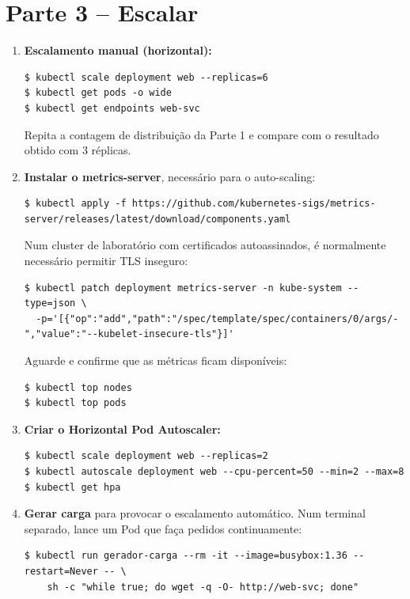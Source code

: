 \documentclass[11pt,a4paper]{article}
\begin{document}
\section{Parte 3 -- Escalar}
\begin{enumerate}[label=\arabic*.,resume]

  \item \textbf{Escalamento manual (horizontal):}
\begin{lstlisting}
$ kubectl scale deployment web --replicas=6
$ kubectl get pods -o wide
$ kubectl get endpoints web-svc
\end{lstlisting}
  Repita a contagem de distribuição da Parte 1 e compare com o resultado obtido com 3 réplicas.

  \item \textbf{Instalar o metrics-server}, necessário para o auto-scaling:
\begin{lstlisting}
$ kubectl apply -f https://github.com/kubernetes-sigs/metrics-server/releases/latest/download/components.yaml
\end{lstlisting}
  Num cluster de laboratório com certificados autoassinados, é normalmente necessário permitir TLS inseguro:
\begin{lstlisting}
$ kubectl patch deployment metrics-server -n kube-system --type=json \
  -p='[{"op":"add","path":"/spec/template/spec/containers/0/args/-","value":"--kubelet-insecure-tls"}]'
\end{lstlisting}
  Aguarde e confirme que as métricas ficam disponíveis:
\begin{lstlisting}
$ kubectl top nodes
$ kubectl top pods
\end{lstlisting}

  \item \textbf{Criar o Horizontal Pod Autoscaler:}
\begin{lstlisting}
$ kubectl scale deployment web --replicas=2
$ kubectl autoscale deployment web --cpu-percent=50 --min=2 --max=8
$ kubectl get hpa
\end{lstlisting}

  \item \textbf{Gerar carga} para provocar o escalamento automático. Num terminal separado, lance um Pod que faça pedidos continuamente:
\begin{lstlisting}
$ kubectl run gerador-carga --rm -it --image=busybox:1.36 --restart=Never -- \
    sh -c "while true; do wget -q -O- http://web-svc; done"
\end{lstlisting}


\end{enumerate}
\end{document}
